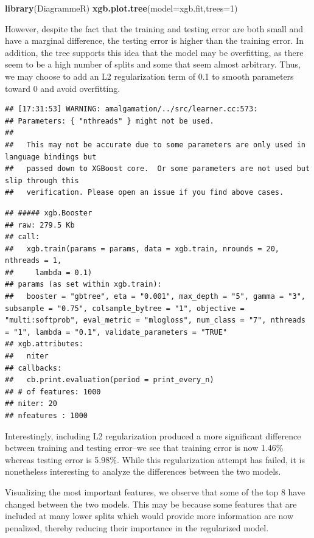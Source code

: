 \documentclass[]{article}
\newenvironment{Shaded}{\begin{snugshade}}{\end{snugshade}}
\newcommand{\DataTypeTok}[1]{\textcolor[rgb]{0.13,0.29,0.53}{#1}}
\newcommand{\DecValTok}[1]{\textcolor[rgb]{0.00,0.00,0.81}{#1}}
\newcommand{\KeywordTok}[1]{\textcolor[rgb]{0.13,0.29,0.53}{\textbf{#1}}}
\newcommand{\NormalTok}[1]{#1}
\begin{document}
\begin{Shaded}
\begin{Highlighting}[]
\KeywordTok{library}\NormalTok{(DiagrammeR)}
\KeywordTok{xgb.plot.tree}\NormalTok{(}\DataTypeTok{model=}\NormalTok{xgb.fit,}\DataTypeTok{trees=}\DecValTok{1}\NormalTok{)}
\end{Highlighting}
\end{Shaded}

However, despite the fact that the training and testing error are both
small and have a marginal difference, the testing error is higher than
the training error. In addition, the tree supports this idea that the
model may be overfitting, as there seem to be a high number of splits
and some that seem almost arbitrary. Thus, we may choose to add an L2
regularization term of 0.1 to smooth parameters toward 0 and avoid
overfitting.

\begin{verbatim}
## [17:31:53] WARNING: amalgamation/../src/learner.cc:573: 
## Parameters: { "nthreads" } might not be used.
## 
##   This may not be accurate due to some parameters are only used in language bindings but
##   passed down to XGBoost core.  Or some parameters are not used but slip through this
##   verification. Please open an issue if you find above cases.
\end{verbatim}

\begin{verbatim}
## ##### xgb.Booster
## raw: 279.5 Kb 
## call:
##   xgb.train(params = params, data = xgb.train, nrounds = 20, nthreads = 1, 
##     lambda = 0.1)
## params (as set within xgb.train):
##   booster = "gbtree", eta = "0.001", max_depth = "5", gamma = "3", subsample = "0.75", colsample_bytree = "1", objective = "multi:softprob", eval_metric = "mlogloss", num_class = "7", nthreads = "1", lambda = "0.1", validate_parameters = "TRUE"
## xgb.attributes:
##   niter
## callbacks:
##   cb.print.evaluation(period = print_every_n)
## # of features: 1000 
## niter: 20
## nfeatures : 1000
\end{verbatim}

Interestingly, including L2 regularization produced a more significant
difference between training and testing error--we see that training
error is now 1.46\% whereas testing error is 5.98\%. While this
regularization attempt has failed, it is nonetheless interesting to
analyze the differences between the two models.

Visualizing the most important features, we observe that some of the top
8 have changed between the two models. This may be because some features
that are included at many lower splits which would provide more
information are now penalized, thereby reducing their importance in the
regularized model.
\end{document}
